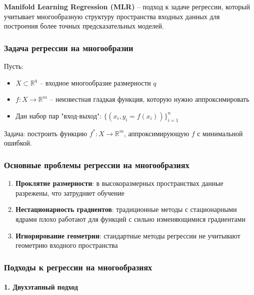 \documentclass[a4paper,12pt]{article}
\begin{document}
\textbf{Manifold Learning Regression (MLR)} -- подход к задаче регрессии, который учитывает многообразную структуру пространства входных данных для построения более точных предсказательных моделей.

\subsubsection{Задача регрессии на многообразии}

Пусть:
\begin{itemize}
    \item $X \subset \mathbb{R}^q$ -- входное многообразие размерности $q$
    \item $f: X \rightarrow \mathbb{R}^m$ -- неизвестная гладкая функция, которую нужно аппроксимировать
    \item Дан набор пар "вход-выход": $\{(x_i, y_i = f(x_i))\}_{i=1}^n$
\end{itemize}

Задача: построить функцию $f^*: X \rightarrow \mathbb{R}^m$, аппроксимирующую $f$ с минимальной ошибкой.

\subsubsection{Основные проблемы регрессии на многообразиях}

\begin{enumerate}
    \item \textbf{Проклятие размерности}: в высокоразмерных пространствах данные разрежены, что затрудняет обучение
    \item \textbf{Нестационарность градиентов}: традиционные методы с стационарными ядрами плохо работают для функций с сильно изменяющимися градиентами
    \item \textbf{Игнорирование геометрии}: стандартные методы регрессии не учитывают геометрию входного пространства
\end{enumerate}

\subsubsection{Подходы к регрессии на многообразиях}

\paragraph{1. Двухэтапный подход}
\end{document}
